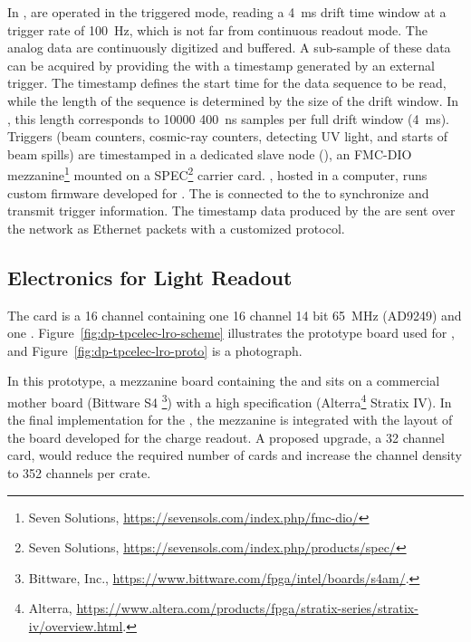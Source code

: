 In ,  are operated in the triggered mode, reading a \SI{4}{\milli\second} drift time window at a trigger rate of \SI{100}{Hz}, which is not far from continuous readout mode. The analog data are continuously digitized and buffered. A sub-sample of these data can be acquired by providing the  with a timestamp generated by an external trigger. The timestamp defines the start time for the data sequence to be read, while the length of the sequence is determined by the size of the drift window. In , this length corresponds to \num{10000} \SI{400}{\nano\second} samples per full drift window (\SI{4}{\milli\second}). Triggers (beam counters, cosmic-ray counters,  detecting UV light, and starts of beam spills) are timestamped in a dedicated  slave node (), an FMC-DIO mezzanine\footnote{Seven Solutions\texttrademark{}, \url{https://sevensols.com/index.php/fmc-dio/}} mounted on a  SPEC\footnote{Seven Solutions\texttrademark{}, \url{https://sevensols.com/index.php/products/spec/}} carrier card. , hosted in a computer, runs custom firmware developed for . 
The  is connected to the  to synchronize and transmit trigger information. The timestamp data produced by the  are sent over the  network as Ethernet packets with a customized protocol. 


\subsection{Electronics for Light Readout}
\label{sec:fddp-tpc-elec-design-lro}

The  card is a \num{16} channel  containing one \num{16} channel \num{14} bit \SI{65}{\MHz}  (AD9249) and one  . Figure~\ref{fig:dp-tpcelec-lro-scheme} illustrates %
the prototype board used for , and Figure~\ref{fig:dp-tpcelec-lro-proto} is %
a photograph. 

In this prototype, a mezzanine board containing the  and  sits on a commercial mother board (Bittware S4 \footnote{Bittware\texttrademark{}, Inc., \url{https://www.bittware.com/fpga/intel/boards/s4am/}.}) with a high specification  (Alterra\footnote{Alterra\texttrademark{}, \url{https://www.altera.com/products/fpga/stratix-series/stratix-iv/overview.html}.} Stratix IV). In the final implementation %
for the , the mezzanine is integrated with the layout of the  board developed for the charge readout.  
A proposed upgrade, a \num{32} channel card, would reduce the required number of cards and increase the channel density to \num{352} channels per  crate.

